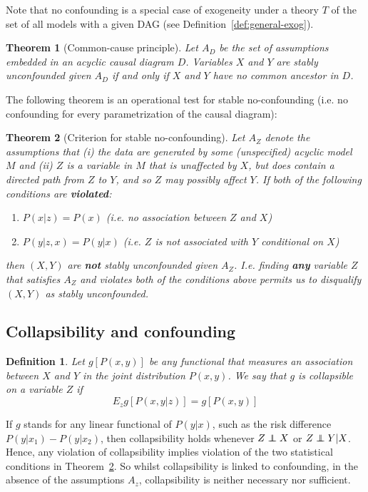 \documentclass[11pt]{article}
\numberwithin{equation}{section}
\newcommand\indep{\protect\mathpalette{\protect\independenT}{\perp}}
\def\independenT#1#2{\mathrel{\rlap{$#1#2$}\mkern2mu{#1#2}}}
\newtheorem{thm}{Theorem}[section]
\newtheorem{defn}{Definition}[section]
\begin{document}
Note that no confounding is a special case of exogeneity under a theory $T$ of the set of all models with a given DAG (see Definition~\ref{def:general-exog}). 

\begin{thm}[Common-cause principle]
Let $A_D$ be the set of assumptions embedded in an acyclic causal diagram $D$. Variables $X$ and $Y$ are stably unconfounded given $A_D$ if and only if $X$ and $Y$ have no common ancestor in $D$.
\end{thm}

The following theorem is an operational test for stable no-confounding (i.e. no confounding for every parametrization of the causal diagram):
\begin{thm}[Criterion for stable no-confounding]\label{thm:no-conf-criterion}
Let $A_Z$ denote the assumptions that (i) the data are generated by some (unspecified) acyclic model $M$ and (ii) $Z$ is a variable in $M$ that is unaffected by $X$, but does contain a directed path from $Z$ to $Y$, and so $Z$ may possibly affect $Y$. If both of the following conditions are \textbf{violated}:
\begin{enumerate}[noitemsep]
\item $P(x|z)=P(x)$ (i.e. no association between $Z$ and $X$)
\item $P(y|z,x)=P(y|x)$ (i.e. $Z$ is not associated with $Y$ conditional on $X$)
\end{enumerate}
then $(X,Y)$ are \textbf{not} stably unconfounded given $A_Z$. I.e. finding \textbf{any} variable $Z$ that satisfies $A_Z$ and violates both of the conditions above permits us to disqualify $(X,Y)$ as stably unconfounded.
\end{thm}

\subsection{Collapsibility and confounding}
\begin{defn}
Let $g[P(x,y)]$ be any functional that measures an association between $X$ and $Y$ in the joint distribution $P(x,y)$. We say that $g$ is collapsible on a variable $Z$ if 
\begin{equation}
E_z g[P(x,y|z)] = g[P(x,y)]
\end{equation}
\end{defn}

If $g$ stands for any linear functional of $P(y|x)$, such as the risk difference $P(y|x_1) - P(y|x_2)$, then collapsibility holds whenever $Z \indep X$ or $Z \indep Y| X$. Hence, any violation of collapsibility implies violation of the two statistical conditions in Theorem~\ref{thm:no-conf-criterion}. So whilst collapsibility is linked to confounding, in the absence of the assumptions $A_z$, collapsibility is neither necessary nor sufficient.
\end{document}
